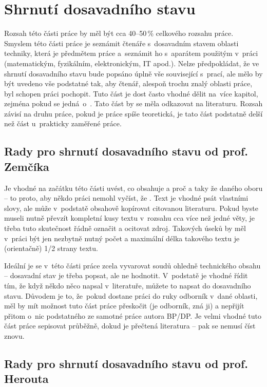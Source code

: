 \section{Shrnutí dosavadního stavu}
\label{stav}

Rozsah této části práce by měl být cca 40--50\,\% celkového rozsahu práce. Smyslem této části práce je seznámit čtenáře s~dosavadním stavem oblasti techniky, která je předmětem práce a~seznámit ho s~aparátem použitým v~práci (matematickým, fyzikálním, elektronickým, IT apod.). Nelze předpokládat, že ve shrnutí dosavadního stavu bude popsáno úplně vše související s~prací, ale mělo by být uvedeno vše podstatné tak, aby čtenář, alespoň trochu znalý oblasti práce, byl schopen práci pochopit. Tuto část je dost často vhodné dělit na~více kapitol, zejména pokud se jedná~o~. Tato část by se měla  odkazovat na literaturu. Rozsah závisí na druhu práce, pokud je práce spíše teoretická, je tato část podstatně delší než část u~prakticky zaměřené práce.

\subsection*{Rady pro shrnutí dosavadního stavu od prof. Zemčíka}
 
Je vhodné na začátku této části uvést, co obsahuje a proč a taky že  daného oboru -- to proto, aby někdo práci nemohl vyčíst, že . Text je vhodné psát vlastními slovy, ale může v~podstatě obsahově kopírovat citovanou literaturu. Pokud byste museli nutně převzít kompletní kusy textu v~rozsahu cca více než jedné věty, je třeba tuto skutečnost řádně označit a ocitovat zdroj. Takových úseků by měl v~práci být jen nezbytně nutný počet a maximální délka takového textu je (orientačně) 1/2 strany textu. 

Ideální je se v~této části práce zcela vyvarovat soudů ohledně technického obsahu -- dosavadní stav je třeba popsat, ale ne hodnotit. V~podstatě je vhodné řídit tím, že když někdo něco napsal v~literatuře, můžete to napsat do dosavadního stavu. Důvodem je to, že~pokud dostane práci do ruky odborník v~dané oblasti, měl by mít možnost tuto část práce přeskočit (je odborník, zná ji) a nepřijít přitom o~nic podstatného ze samotné práce autora BP/DP. Je velmi vhodné tuto část práce sepisovat průběžně, dokud je přečtená literatura  -- pak se nemusí číst znovu.


\subsection*{Rady pro shrnutí dosavadního stavu od prof. Herouta}

